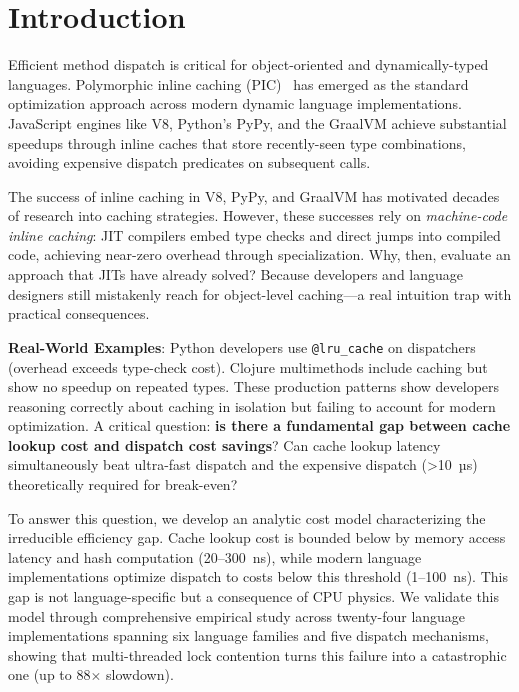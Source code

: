 \documentclass[sigplan,final,acmsmall,review,screen]{acmart}
\begin{document}


\maketitle

\section{Introduction}

Efficient method dispatch is critical for object-oriented and dynamically-typed languages.
Polymorphic inline caching (PIC)~\cite{hoelzle1991optimizing} has emerged as the standard
optimization approach across modern dynamic language implementations. JavaScript engines like V8,
Python's PyPy, and the GraalVM achieve substantial speedups through inline caches that store
recently-seen type combinations, avoiding expensive dispatch predicates on subsequent calls.

The success of inline caching in V8, PyPy, and GraalVM has motivated decades of research into caching strategies. However, these
successes rely on \emph{machine-code inline caching}: JIT compilers embed type checks and direct jumps into compiled code, achieving near-zero overhead through specialization. Why, then, evaluate an approach that JITs have already solved? Because developers and language designers still mistakenly reach for object-level caching—a real intuition trap with practical consequences.

\textbf{Real-World Examples}: Python developers use \texttt{@lru\_cache} on dispatchers (overhead exceeds type-check cost). Clojure multimethods include caching but show no speedup on repeated types. These production patterns show developers reasoning correctly about caching in isolation but failing to account for modern optimization. A critical question: \textbf{is there a fundamental gap between cache lookup cost and dispatch cost savings}? Can cache lookup latency simultaneously beat ultra-fast dispatch and the expensive dispatch (>10~µs) theoretically required for break-even?

  To answer this question, we develop an analytic cost model characterizing the irreducible efficiency gap. Cache lookup cost is bounded below
  by memory access latency and hash computation (20--300~ns), while modern language implementations optimize dispatch to costs below this threshold
  (1--100~ns). This gap is not language-specific but a consequence of CPU physics. We validate this model through comprehensive empirical study
  across twenty-four language implementations spanning six language families and five dispatch mechanisms, showing that multi-threaded lock contention turns this failure into a catastrophic one (up to 88$\times$ slowdown).
\end{document}
